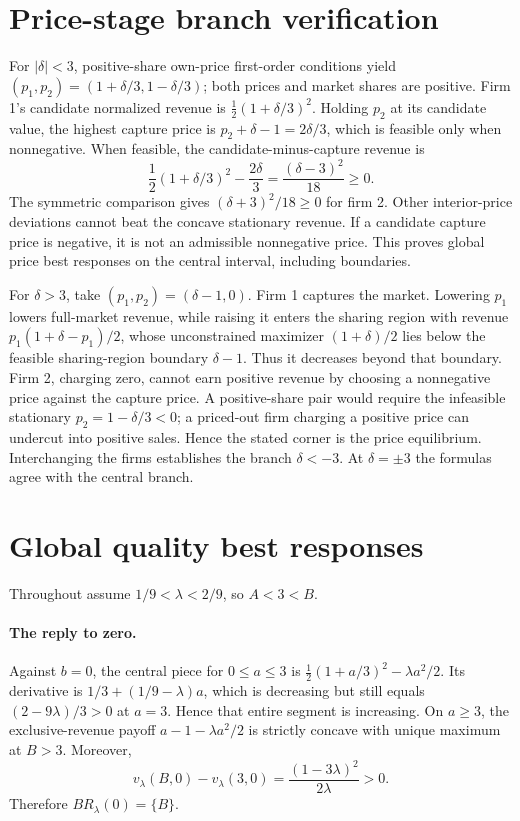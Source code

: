 \documentclass[11pt]{article}
\begin{document}
\appendix
\section{Price-stage branch verification}
\label{app:priceproof}
For $|\delta|<3$, positive-share own-price
first-order conditions yield
$(p_1,p_2)=(1+\delta/3,1-\delta/3)$;
both prices and market shares are positive.
Firm 1's candidate normalized revenue is
$\frac12(1+\delta/3)^2$. Holding $p_2$
at its candidate value, the highest
capture price is $p_2+\delta-1=2\delta/3$,
which is feasible only when nonnegative.
When feasible, the candidate-minus-capture
revenue is
\[
\frac12(1+\delta/3)^2-\frac{2\delta}{3}
=\frac{(\delta-3)^2}{18}\geq0.
\]
The symmetric comparison gives
$(\delta+3)^2/18\geq0$ for firm 2.
Other interior-price deviations cannot
beat the concave stationary revenue.
If a candidate capture price is negative,
it is not an admissible nonnegative price.
This proves global price best responses on
the central interval, including boundaries.

For $\delta>3$, take
$(p_1,p_2)=(\delta-1,0)$.
Firm 1 captures the market. Lowering
$p_1$ lowers full-market revenue, while
raising it enters the sharing region with
revenue $p_1(1+\delta-p_1)/2$,
whose unconstrained maximizer
$(1+\delta)/2$ lies below the feasible
sharing-region boundary $\delta-1$.
Thus it decreases beyond that boundary.
Firm 2, charging zero, cannot earn
positive revenue by choosing a nonnegative
price against the capture price.
A positive-share pair would require
the infeasible stationary
$p_2=1-\delta/3<0$; a priced-out firm
charging a positive price can undercut
into positive sales. Hence the stated
corner is the price equilibrium.
Interchanging the firms establishes
the branch $\delta<-3$.
At $\delta=\pm3$ the formulas
agree with the central branch.

\section{Global quality best responses}
\label{app:qualityproof}
Throughout assume $1/9<\lambda<2/9$,
so $A<3<B$.

\paragraph{The reply to zero.}
Against $b=0$, the central piece for
$0\leq a\leq3$ is
$\frac12(1+a/3)^2-\lambda a^2/2$.
Its derivative is
$1/3+(1/9-\lambda)a$,
which is decreasing but still equals
$(2-9\lambda)/3>0$ at $a=3$.
Hence that entire segment is increasing.
On $a\geq3$, the exclusive-revenue
payoff $a-1-\lambda a^2/2$
is strictly concave with unique maximum
at $B>3$. Moreover,
\[
v_\lambda(B,0)-v_\lambda(3,0)
=\frac{(1-3\lambda)^2}{2\lambda}>0.
\]
Therefore $BR_\lambda(0)=\{B\}$.
\end{document}
